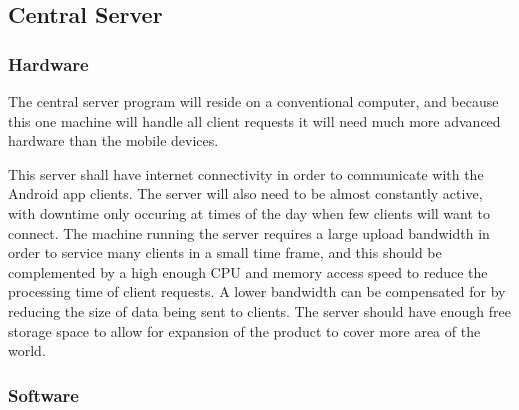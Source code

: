 	\subsection{Central Server}
		\subsubsection{Hardware}
			The central server program will reside on a conventional computer, and because this one machine will handle all client requests it will need much more advanced hardware than the mobile devices.

			This server shall have internet connectivity in order to communicate with the Android app clients. The server will also need to be almost constantly active, with downtime only occuring at times of the day when few clients will want to connect. The machine running the server requires a large upload bandwidth in order to service many clients in a small time frame, and this should be complemented by a high enough CPU and memory access speed to reduce the processing time of client requests. A lower bandwidth can be compensated for by reducing the size of data being sent to clients. The server should have enough free storage space to allow for expansion of the product to cover more area of the world.
		\subsubsection{Software}
